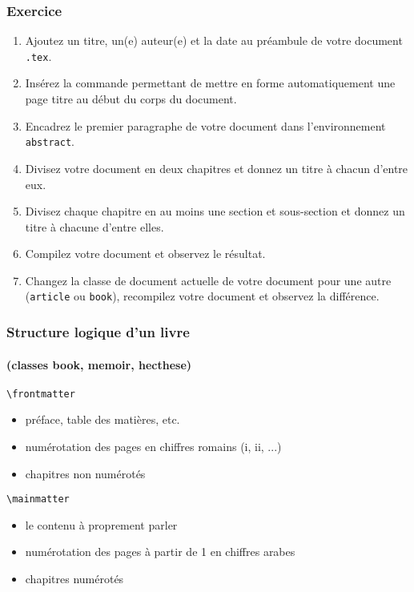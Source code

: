 
\begin{frame}

	\frametitle{Exercice \thenoExercice}
	
	\begin{enumerate}
		\item Ajoutez un titre, un(e) auteur(e) et la date au préambule de votre document \texttt{.tex}.
		\item Insérez la commande permettant de mettre en forme automatiquement une page titre
			au début du corps du document.
		\item Encadrez le premier paragraphe de votre document dans l'environnement \texttt{abstract}.
		\item Divisez votre document en deux chapitres et donnez un titre à chacun d'entre eux.
		\item Divisez chaque chapitre en au moins une section et sous-section et donnez un titre à chacune d'entre elles.
		\item Compilez votre document et observez le résultat.
		\item Changez la classe de document actuelle de votre document pour une autre (\texttt{article} ou \texttt{book}), recompilez votre document et observez la différence.
	\end{enumerate}
\end{frame}


\begin{frame}[fragile]

	\frametitle{Structure logique d'un livre}
	\framesubtitle{(classes book, memoir, hecthese)}
	
	\lstinline|\frontmatter|	
	
	\begin{itemize}
		\item préface, table des matières, etc.
		\item numérotation des pages en chiffres romains (i, ii, ...)
		\item chapitres non numérotés
	\end{itemize}
	
	\lstinline|\mainmatter|	
	
	\begin{itemize}
		\item le contenu à proprement parler
		\item numérotation des pages à partir de 1 en chiffres arabes
		\item chapitres numérotés
	\end{itemize}

\end{frame}

